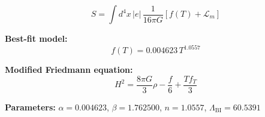 
\begin{equation}
  S = \int d^4x \, |e| \, \frac{1}{16\pi G} \left[ f(T) + \mathcal{L}_m \right]
\end{equation}

\textbf{Best-fit model:}
\begin{equation}
  f(T) = 0.004623 \, T^{1.0557}
\end{equation}

\textbf{Modified Friedmann equation:}
\begin{equation}
  H^2 = \frac{8\pi G}{3} \rho - \frac{f}{6} + \frac{T f_T}{3}
\end{equation}

\textbf{Parameters:}
$\alpha = 0.004623$, \quad
$\beta = 1.762500$, \quad
$n = 1.0557$, \quad
$\Lambda_{\text{BI}} = 60.5391$